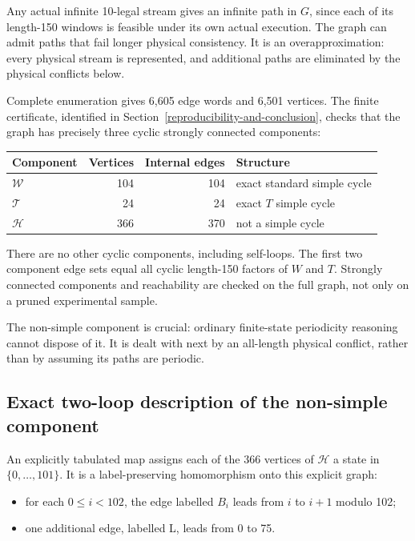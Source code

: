 \documentclass[
  11pt,
]{article}
\providecommand{\tightlist}{%
  \setlength{\itemsep}{0pt}\setlength{\parskip}{0pt}}
\begin{document}
Any actual infinite 10-legal stream gives an infinite path in \(G\),
since each of its length-150 windows is feasible under its own actual
execution. The graph can admit paths that fail longer physical
consistency. It is an overapproximation: every physical stream is represented, and
additional paths are eliminated by the physical conflicts below.

Complete enumeration gives 6,605 edge words and 6,501 vertices. The
finite certificate, identified in Section~\ref{reproducibility-and-conclusion},
checks that the graph has precisely three cyclic strongly connected components:

\begin{longtable}[]{@{}lrrl@{}}
\toprule\noalign{}
Component & Vertices & Internal edges & Structure \\
\midrule\noalign{}
\endhead
\bottomrule\noalign{}
\endlastfoot
\(\mathcal W\) & 104 & 104 & exact standard simple cycle \\
\(\mathcal T\) & 24 & 24 & exact \(T\) simple cycle \\
\(\mathcal H\) & 366 & 370 & not a simple cycle \\
\end{longtable}

There are no other cyclic components, including self-loops. The first
two component edge sets equal all cyclic length-150 factors of \(W\) and
\(T\). Strongly connected components and reachability are checked on the
full graph, not only on a pruned experimental sample.

The non-simple component is crucial: ordinary finite-state periodicity
reasoning cannot dispose of it. It is dealt with next by an all-length
physical conflict, rather than by assuming its paths are periodic.

\subsection{Exact two-loop description of the non-simple
component}\label{ten-3}

An explicitly tabulated map assigns each of the 366 vertices of
\(\mathcal H\) a state in \(\{0,\ldots,101\}\). It is a
label-preserving homomorphism onto this explicit graph:

\begin{itemize}
\tightlist
\item
  for each \(0\le i<102\), the edge labelled \(B_i\) leads from \(i\) to
  \(i+1\) modulo 102;
\item
  one additional edge, labelled L, leads from 0 to 75.
\end{itemize}
\end{document}
